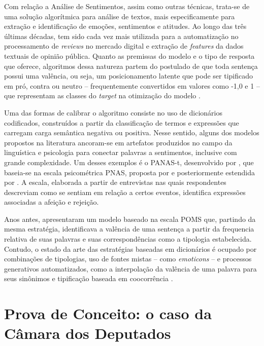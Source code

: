 \documentclass[
12pt,				%
openright,			%
twoside,			%
a4paper,			%
english,			%
french,				%
spanish,			%
brazil				%
]{abntex2}
\begin{document}
Com relação a Análise de Sentimentos, assim como outras técnicas, trata-se de uma solução algorítmica para análise de textos, mais especificamente para extração e identificação de emoções, sentimentos e atitudes. Ao longo das três últimas décadas, tem sido cada vez mais utilizada para a automatização no processamento de \emph{reviews} no mercado digital e extração de \emph{features} da dados textuais de opinião pública. Quanto as premissas do modelo e o tipo de resposta que oferece, algoritmos dessa natureza partem do postulado de que toda sentença possui uma valência, ou seja, um posicionamento latente que pode ser tipificado em pró, contra ou neutro -- frequentemente convertidos em valores como -1,0 e 1 -- que representam as classes do \emph{target} na otimização do modelo \cite{serrano2015sentiment, mantyla2018evolution}.  

Uma das formas de calibrar o algoritmo consiste no uso de dicionários codificados, construídos a partir da classificação de termos e expressões que carregam carga semântica negativa ou positiva. Nesse sentido, alguns dos modelos propostos na literatura ancoram-se em artefatos produzidos no campo da linguística e psicologia para conectar palavras a sentimentos, inclusive com grande complexidade. Um desses exemplos é o PANAS-t, desenvolvido por  , que baseia-se na escala psicométrica PNAS, proposta por  e posteriormente estendida por . A escala, elaborada a partir de entrevistas nas quais respondentes descreviam como se sentiam em relação a certos eventos, identifica expressões associadas a afeição e rejeição. 

Anos antes,  apresentaram um modelo baseado na escala POMS \cite{mcnair2003profile} que, partindo da mesma estratégia, identificava a valência de uma sentença a partir da frequencia relativa de suas palavras e suas correspondências como a tipologia estabelecida. Contudo, o estado da arte das estratégias baseadas em dicionários é ocupado por combinações de tipologias, uso de fontes mistas -- como \emph{emoticons} --  e processos generativos automatizados, como a interpolação da valência de uma palavra para seus sinônimos e tipificação baseada em coocorrência \cite{hogenboom2013exploiting, hutto2014vader, thelwall2014sentistrength, canuto2016exploiting}.


\chapter{Prova de Conceito: o caso da Câmara dos Deputados}\label{resultados}
\end{document}
